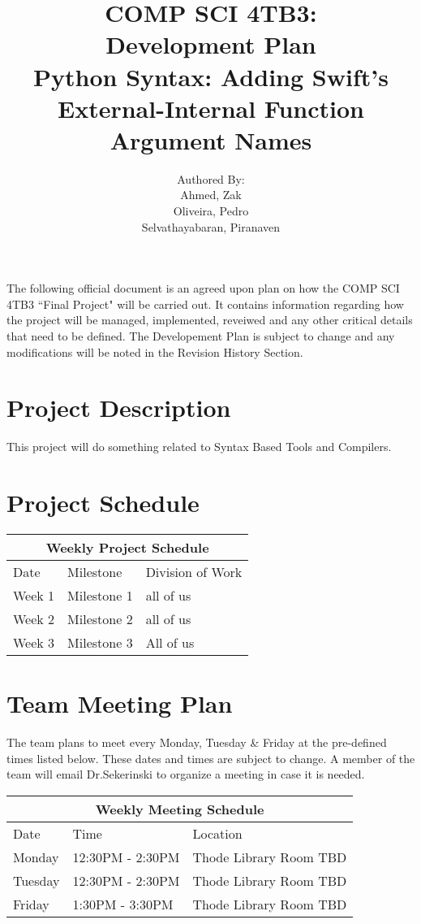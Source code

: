 \documentclass{article}
\title{COMP SCI 4TB3:\\ Development Plan\\ Python Syntax:  Adding Swift's External-Internal Function Argument Names}
\author{ Authored By:
		\\ Ahmed, Zak
		\\ Oliveira, Pedro
		\\ Selvathayabaran, Piranaven
}
\date{}
\begin{document}
\newpage

\maketitle

The following official document is an agreed upon plan on how the COMP SCI 4TB3 ``Final Project" will be carried out. It contains information regarding how the project will be managed, implemented, reveiwed and any other critical details that need to be defined. The Developement Plan is subject to change and any modifications will be noted in the Revision History Section. 

\tableofcontents 

\section {Project Description}
This project will do something related to Syntax Based Tools and Compilers.
 
 \section{Project Schedule}

\begin{tabular}{ |p{3cm}||p{3cm}|p{3cm}|  }
 \hline
 \multicolumn{3}{|c|}{Weekly Project Schedule} \\
 \hline
 Date & Milestone  & Division of Work \\
 Week 1 & Milestone 1 & all of us\\
 Week 2 & Milestone 2 & all of us\\
 Week 3 & Milestone 3 & All of us\\
 \hline


 \hline
\end{tabular}
 
\section{Team Meeting Plan}
The team plans to meet every Monday, Tuesday \& Friday at the pre-defined times listed below. These dates and times are subject to change. A member of the team will email Dr.Sekerinski to organize a meeting in case it is needed.\newline 

\begin{tabular}{ |p{3cm}||p{3cm}|p{3cm}|  }
 \hline
 \multicolumn{3}{|c|}{Weekly Meeting Schedule} \\
 \hline
 Date &Time  & Location\\
 \hline
 Monday &   12:30PM - 2:30PM   & Thode Library Room TBD  \\
 Tuesday &   12:30PM - 2:30PM   & Thode Library Room TBD  \\
 Friday  & 1:30PM - 3:30PM & Thode Library Room TBD  \\

 \hline
\end{tabular}
\end{document}
